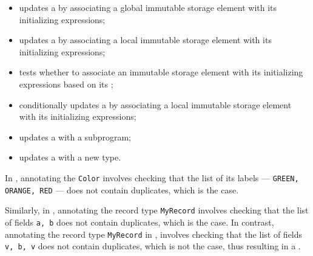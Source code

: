\begin{itemize}
  \item {} updates a \globalstaticenvironmentterm{} by associating a global immutable storage element
        with its initializing expressions;
  \item {} updates a \localstaticenvironmentterm{} by associating a local immutable storage element
        with its initializing expressions;
  \item {} tests whether to associate an immutable storage element
        with its initializing expressions based on its \sideeffectdescriptorsetsterm;
  \item {} conditionally updates a \staticenvironmentterm{} by associating
        a local immutable storage element with its initializing expressions;
  \item {} updates a \staticenvironmentterm{} with a subprogram;
  \item {} updates a \staticenvironmentterm{} with a new type.
\end{itemize}


In , annotating the \enumerationtypeterm{} \verb|Color|
involves checking that the list of its labels --- \verb|GREEN, ORANGE, RED| --- does not contain duplicates,
which is the case.

Similarly, in , annotating the record type \verb|MyRecord|
involves checking that the list of fields \verb|a, b| does not contain duplicates, which is the case.
In contrast, annotating the record type \verb|MyRecord| in ,
involves checking that the list of fields \verb|v, b, v| does not contain duplicates, which is not the case,
thus resulting in a \typingerrorterm.

